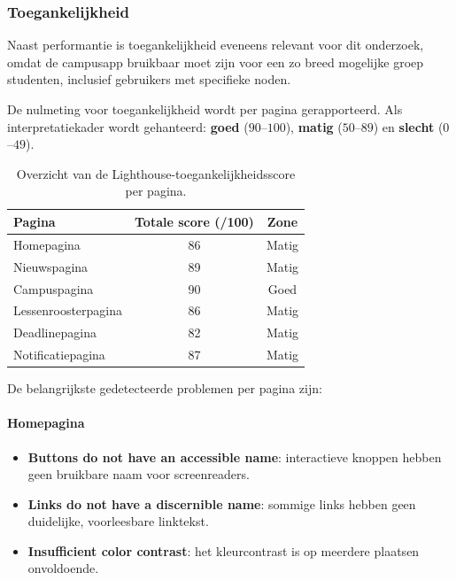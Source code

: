 
\subsubsection{Toegankelijkheid}
Naast performantie is toegankelijkheid eveneens relevant voor dit onderzoek, omdat de campusapp bruikbaar moet zijn voor een zo breed mogelijke groep studenten, inclusief gebruikers met specifieke noden.

De nulmeting voor toegankelijkheid wordt per pagina gerapporteerd. Als interpretatiekader wordt gehanteerd: \textbf{goed} ($90$--$100$), \textbf{matig} ($50$--$89$) en \textbf{slecht} ($0$--$49$).

\begin{table}[h]
\centering
\caption[Toegankelijkheidsscore per pagina]{Overzicht van de Lighthouse-toegankelijkheidsscore per pagina.}
\label{tab:toegankelijkheid-nulmeting-score-per-pagina}
\begin{tabular}{lcc}
\hline
\textbf{Pagina} & \textbf{Totale score (/100)} & \textbf{Zone} \\
\hline
Homepagina & 86 & Matig \\
Nieuwspagina & 89 & Matig \\
Campuspagina & 90 & Goed \\
Lessenroosterpagina & 86 & Matig \\
Deadlinepagina & 82 & Matig \\
Notificatiepagina & 87 & Matig \\
\hline
\end{tabular}
\end{table}



De belangrijkste gedetecteerde problemen per pagina zijn:

\paragraph{Homepagina}
\begin{itemize}
\item \textbf{Buttons do not have an accessible name}: interactieve knoppen hebben geen bruikbare naam voor screenreaders.
\item \textbf{Links do not have a discernible name}: sommige links hebben geen duidelijke, voorleesbare linktekst.
\item \textbf{Insufficient color contrast}: het kleurcontrast is op meerdere plaatsen onvoldoende.
\end{itemize}

